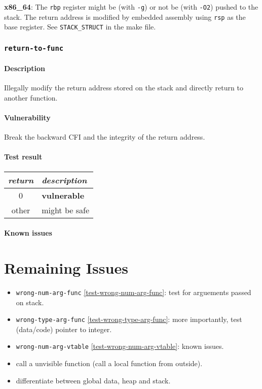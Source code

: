 \documentclass[a4paper]{book}
\begin{document}
\textbf{x86\_64}: The \texttt{rbp} register might be (with \texttt{-g}) or not be (with \texttt{-O2}) pushed to the stack.
The return address is modified by embedded assembly using \texttt{rsp} as the base register. See \texttt{STACK\_STRUCT} in the make file.

\newpage
\subsection{\texttt{return-to-func}}\label{test-return-to-func}

\subsubsection{Description}
Illegally modify the return address stored on the stack and directly return to another function.

\subsubsection{Vulnerability}
Break the backward CFI and the integrity of the return address.

\subsubsection{Test result}
\begin{tabular}{cl}
  \toprule
  \emph{return}  & \emph{description} \\
  \midrule
  0              & \textbf{vulnerable} \\
  other          & might be safe \\
  \bottomrule
\end{tabular}
  
\subsubsection{Known issues}

\chapter{Remaining Issues}

\begin{itemize}
  \item \texttt{wrong-num-arg-func} \ref{test-wrong-num-arg-func}: test for arguements passed on stack.
  \item \texttt{wrong-type-arg-func} \ref{test-wrong-type-arg-func}: more importantly, test (data/code) pointer to integer.
  \item \texttt{wrong-num-arg-vtable} \ref{test-wrong-num-arg-vtable}: known issues.
  \item call a unvisible function (call a local function from outside).
  \item differentiate between global data, heap and stack.
\end{itemize}
\end{document}
